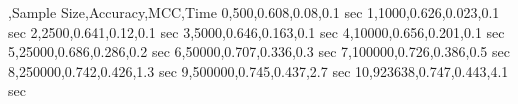 ,Sample Size,Accuracy,MCC,Time
0,500,0.608,0.08,0.1 sec
1,1000,0.626,0.023,0.1 sec
2,2500,0.641,0.12,0.1 sec
3,5000,0.646,0.163,0.1 sec
4,10000,0.656,0.201,0.1 sec
5,25000,0.686,0.286,0.2 sec
6,50000,0.707,0.336,0.3 sec
7,100000,0.726,0.386,0.5 sec
8,250000,0.742,0.426,1.3 sec
9,500000,0.745,0.437,2.7 sec
10,923638,0.747,0.443,4.1 sec
